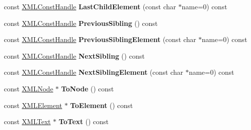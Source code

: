 \begin{DoxyCompactItemize}
\item 
const \hyperlink{classtinyxml2_1_1XMLConstHandle}{X\+M\+L\+Const\+Handle} {\bfseries Last\+Child\+Element} (const char $\ast$name=0) const \hypertarget{classtinyxml2_1_1XMLConstHandle_a8f08be56cd748bd1a756a7c57e8a4e8b}{}\label{classtinyxml2_1_1XMLConstHandle_a8f08be56cd748bd1a756a7c57e8a4e8b}

\item 
const \hyperlink{classtinyxml2_1_1XMLConstHandle}{X\+M\+L\+Const\+Handle} {\bfseries Previous\+Sibling} () const \hypertarget{classtinyxml2_1_1XMLConstHandle_a6917564e26b2c20ebdcb23c7940ad80a}{}\label{classtinyxml2_1_1XMLConstHandle_a6917564e26b2c20ebdcb23c7940ad80a}

\item 
const \hyperlink{classtinyxml2_1_1XMLConstHandle}{X\+M\+L\+Const\+Handle} {\bfseries Previous\+Sibling\+Element} (const char $\ast$name=0) const \hypertarget{classtinyxml2_1_1XMLConstHandle_afe1b35a9c897ae45f74e8d615cb98c2a}{}\label{classtinyxml2_1_1XMLConstHandle_afe1b35a9c897ae45f74e8d615cb98c2a}

\item 
const \hyperlink{classtinyxml2_1_1XMLConstHandle}{X\+M\+L\+Const\+Handle} {\bfseries Next\+Sibling} () const \hypertarget{classtinyxml2_1_1XMLConstHandle_a596e248c8014d718f41658502a2e221b}{}\label{classtinyxml2_1_1XMLConstHandle_a596e248c8014d718f41658502a2e221b}

\item 
const \hyperlink{classtinyxml2_1_1XMLConstHandle}{X\+M\+L\+Const\+Handle} {\bfseries Next\+Sibling\+Element} (const char $\ast$name=0) const \hypertarget{classtinyxml2_1_1XMLConstHandle_a0d50f71f0d4199768508f039426e2b1f}{}\label{classtinyxml2_1_1XMLConstHandle_a0d50f71f0d4199768508f039426e2b1f}

\item 
const \hyperlink{classtinyxml2_1_1XMLNode}{X\+M\+L\+Node} $\ast$ {\bfseries To\+Node} () const \hypertarget{classtinyxml2_1_1XMLConstHandle_a95d0256318c10c3f75fa5f8ffb3e4bc1}{}\label{classtinyxml2_1_1XMLConstHandle_a95d0256318c10c3f75fa5f8ffb3e4bc1}

\item 
const \hyperlink{classtinyxml2_1_1XMLElement}{X\+M\+L\+Element} $\ast$ {\bfseries To\+Element} () const \hypertarget{classtinyxml2_1_1XMLConstHandle_a5a48adefc2a5e70d4ce5b55692a0e2f9}{}\label{classtinyxml2_1_1XMLConstHandle_a5a48adefc2a5e70d4ce5b55692a0e2f9}

\item 
const \hyperlink{classtinyxml2_1_1XMLText}{X\+M\+L\+Text} $\ast$ {\bfseries To\+Text} () const \hypertarget{classtinyxml2_1_1XMLConstHandle_ad86ca7dbb20d0495ae357fe7a866e0be}{}\label{classtinyxml2_1_1XMLConstHandle_ad86ca7dbb20d0495ae357fe7a866e0be}


\end{DoxyCompactItemize}
